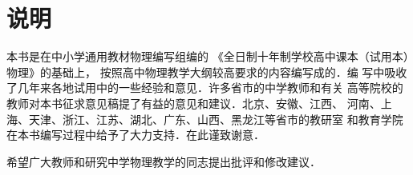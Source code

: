 \chapter{说明}

本书是在中小学通用教材物理编写组编的
《全日制十年制学校高中课本（试用本）物理》的基础上，
按照高中物理教学大纲较高要求的内容编写成的．编
写中吸收了几年来各地试用中的一些经验和意见．许多省市的中学教师和有关
高等院校的教师对本书征求意见稿提了有益的意见和建议．北京、安徽、江西、
河南、上海、天津、浙江、江苏、湖北、广东、山西、黑龙江等省市的教研室
和教育学院在本书编写过程中给予了大力支持．在此谨致谢意．

希望广大教师和研究中学物理教学的同志提出批评和修改建议．

